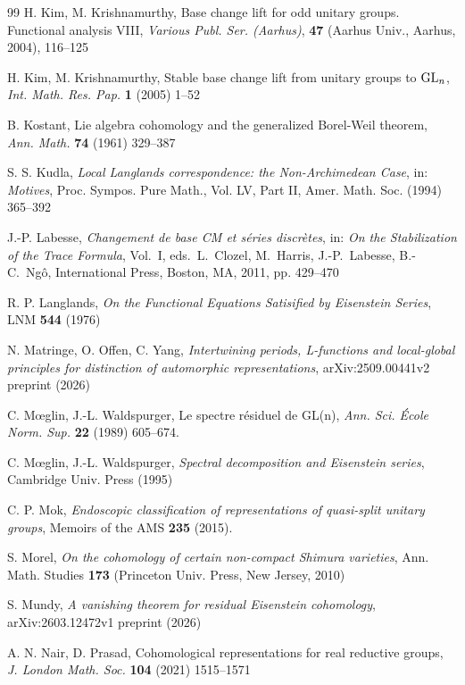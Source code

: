 \documentclass[a4paper,10pt]{amsart}
\theoremstyle{definition}
\numberwithin{equation}{section}
\def\GL{{\rm GL}}
\begin{document}
\begin{thebibliography}{99}
 H. Kim, M. Krishnamurthy, Base change lift for odd unitary groups. Functional analysis VIII, {\it Various Publ. Ser. (Aarhus)}, {\bf 47} (Aarhus Univ., Aarhus, 2004), 116--125

 H. Kim, M. Krishnamurthy, Stable base change lift from unitary groups to $\GL_n$, {\it Int. Math. Res. Pap.} {\bf 1} (2005) 1--52

 B. Kostant, Lie algebra cohomology and the generalized Borel-Weil theorem, {\it Ann. Math.} \textbf{74} (1961) 329--387


 S. S. Kudla, {\it Local Langlands correspondence: the Non-Archimedean Case}, in: {\it Motives}, Proc. Sympos. Pure Math., Vol. LV, Part II, Amer. Math. Soc. (1994) 365--392

   J.-P. Labesse, {\it Changement de base CM et s\'eries discr\`etes}, in: {\it On the Stabilization of the Trace Formula}, Vol.\ I, eds.\ L.\ Clozel, M.\ Harris, J.-P.\ Labesse, B.-C.\ Ng\^ o, International Press, Boston, MA, 2011, pp. 429--470


 R. P. Langlands, {\it On the Functional Equations Satisified by Eisenstein Series},  LNM {\bf 544} (1976)


 N. Matringe, O. Offen, C. Yang, {\it Intertwining periods, L-functions and local-global principles for distinction of automorphic representations}, arXiv:2509.00441v2 preprint (2026)


  C. M\oe glin, J.-L. Waldspurger, Le spectre r\'esiduel de GL(n),  {\it Ann. Sci. \'Ecole Norm. Sup.} {\bf 22} (1989) 605--674.

 C. M\oe glin, J.-L. Waldspurger, {\it Spectral decomposition and Eisenstein series}, Cambridge Univ. Press (1995)

  C. P. Mok, {\it Endoscopic classification of representations of quasi-split unitary groups}, Memoirs of the AMS {\bf 235} (2015).

 S. Morel, {\it On the cohomology of certain non-compact Shimura varieties}, Ann. Math. Studies {\bf 173} (Princeton Univ. Press, New Jersey, 2010)

 S. Mundy, {\it A vanishing theorem for residual Eisenstein cohomology}, arXiv:2603.12472v1 preprint (2026)

 A. N. Nair, D. Prasad, Cohomological representations for real reductive groups, {\it J. London Math. Soc.} {\bf 104} (2021) 1515--1571


\end{thebibliography}
\end{document}
